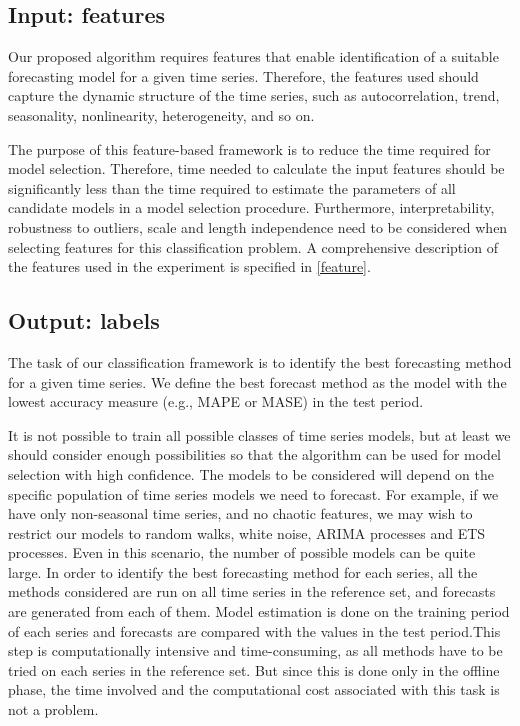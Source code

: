 \documentclass[11pt,a4paper,]{article}
\theoremstyle{definition}
\theoremstyle{definition}
\theoremstyle{definition}
\theoremstyle{remark}
\begin{document}
\subsection{Input: features}\label{input-features}

Our proposed algorithm requires features that enable identification of a
suitable forecasting model for a given time series. Therefore, the
features used should capture the dynamic structure of the time series,
such as autocorrelation, trend, seasonality, nonlinearity,
heterogeneity, and so on.

The purpose of this feature-based framework is to reduce the time
required for model selection. Therefore, time needed to calculate the
input features should be significantly less than the time required to
estimate the parameters of all candidate models in a model selection
procedure. Furthermore, interpretability, robustness to outliers, scale
and length independence need to be considered when selecting features
for this classification problem. A comprehensive description of the
features used in the experiment is specified in \autoref{feature}.

\subsection{Output: labels}\label{output-labels}

The task of our classification framework is to identify the best
forecasting method for a given time series. We define the best forecast
method as the model with the lowest accuracy measure (e.g., MAPE or
MASE) in the test period.

It is not possible to train all possible classes of time series models,
but at least we should consider enough possibilities so that the
algorithm can be used for model selection with high confidence. The
models to be considered will depend on the specific population of time
series models we need to forecast. For example, if we have only
non-seasonal time series, and no chaotic features, we may wish to
restrict our models to random walks, white noise, ARIMA processes and
ETS processes. Even in this scenario, the number of possible models can
be quite large. In order to identify the best forecasting method for
each series, all the methods considered are run on all time series in
the reference set, and forecasts are generated from each of them. Model
estimation is done on the training period of each series and forecasts
are compared with the values in the test period.This step is
computationally intensive and time-consuming, as all methods have to be
tried on each series in the reference set. But since this is done only
in the offline phase, the time involved and the computational cost
associated with this task is not a problem.
\end{document}
